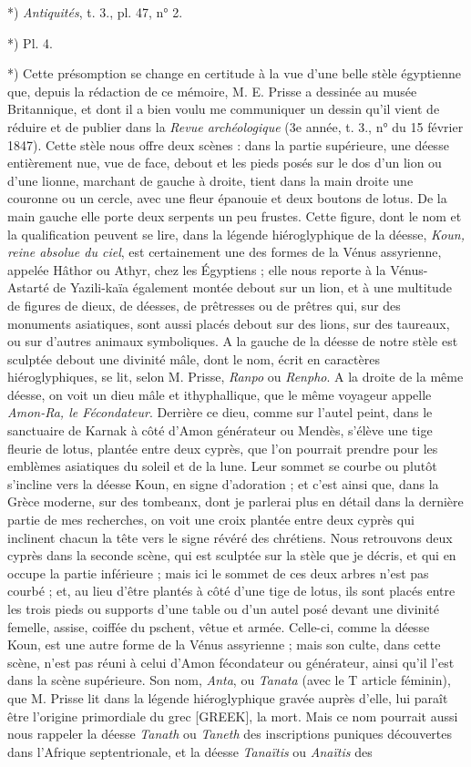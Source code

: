 \documentclass[a4paper, 11pt, oneside, polutonikogreek, french]{article}
\begin{document}
*) \emph{Antiquités}, t. 3., pl. 47, n° 2.

*) Pl. 4.

*) Cette présomption se change en certitude à la vue d'une belle stèle égyptienne que, depuis la rédaction de ce mémoire, M. E. Prisse a dessinée au musée Britannique, et dont il a bien voulu me communiquer un dessin qu'il vient de réduire et de publier dans la \emph{Revue archéologique} (3e année, t. 3., n° du 15 février 1847). Cette stèle nous offre deux scènes : dans la partie supérieure, une déesse entièrement nue, vue de face, debout et les pieds posés sur le dos d'un lion ou d'une lionne, marchant de gauche à droite, tient dans la main droite une couronne ou un cercle, avec une fleur épanouie et deux boutons de lotus. De la main gauche elle porte deux serpents un peu frustes. Cette figure, dont le nom et la qualification peuvent se lire, dans la légende hiéroglyphique de la déesse, \emph{Koun, reine absolue du ciel}, est certainement une des formes de la Vénus assyrienne, appelée Hâthor ou Athyr, chez les Égyptiens ; elle nous reporte à la Vénus-Astarté de Yazili-kaïa également montée debout sur un lion, et à une multitude de figures de dieux, de déesses, de prêtresses ou de prêtres qui, sur des monuments asiatiques, sont aussi placés debout sur des lions, sur des taureaux, ou sur d'autres animaux symboliques. A la gauche de la déesse de notre stèle est sculptée debout une divinité mâle, dont le nom, écrit en caractères hiéroglyphiques, se lit, selon M. Prisse, \emph{Ranpo} ou \emph{Renpho}. A la droite de la même déesse, on voit un dieu mâle et ithyphallique, que le même voyageur appelle \emph{Amon-Ra, le Fécondateur}. Derrière ce dieu, comme sur l'autel peint, dans le sanctuaire de Karnak à côté d'Amon générateur ou Mendès, s'élève une tige fleurie de lotus, plantée entre deux cyprès, que l'on pourrait prendre pour les emblèmes asiatiques du soleil et de la lune. Leur sommet se courbe ou plutôt s'incline vers la déesse Koun, en signe d'adoration ; et c'est ainsi que, dans la Grèce moderne, sur des tombeanx, dont je parlerai plus en détail dans la dernière partie de mes recherches, on voit une croix plantée entre deux cyprès qui inclinent chacun la tête vers le signe révéré des chrétiens. Nous retrouvons deux cyprès dans la seconde scène, qui est sculptée sur la stèle que je décris, et qui en occupe la partie inférieure ; mais ici le sommet de ces deux arbres n'est pas courbé ; et, au lieu d'être plantés à côté d'une tige de lotus, ils sont placés entre les trois pieds ou supports d'une table ou d'un autel posé devant une divinité femelle, assise, coiffée du pschent, vêtue et armée. Celle-ci, comme la déesse Koun, est une autre forme de la Vénus assyrienne ; mais son culte, dans cette scène, n'est pas réuni à celui d'Amon fécondateur ou générateur, ainsi qu'il l'est dans la scène supérieure. Son nom, \emph{Anta}, ou \emph{Tanata} (avec le T article féminin), que M. Prisse lit dans la légende hiéroglyphique gravée auprès d'elle, lui paraît être l'origine primordiale du grec [GREEK], la mort. Mais ce nom pourrait aussi nous rappeler la déesse \emph{Tanath} ou \emph{Taneth} des inscriptions puniques découvertes dans l'Afrique septentrionale, et la déesse \emph{Tanaïtis} ou \emph{Anaïtis} des 
\end{document}
